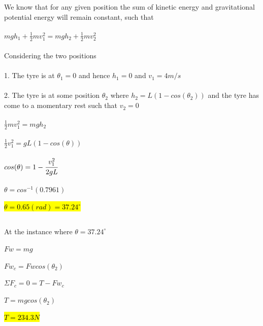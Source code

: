 \documentclass{article}
\begin{document}
\subsection{}
We know that for any given position the sum of kinetic energy and gravitational potential energy will remain constant, such that\\ \\
$mgh_1 + \frac{1}{2}mv_1^2 = mgh_2 + \frac{1}{2}mv_2^2$\\ \\
Considering the two positions\\ \\
1. The tyre is at $\theta_1 = 0$ and hence $h_1 = 0$ and $v_1 = 4m/s$\\ \\
2. The tyre is at some position $\theta_2$ where $h_2 = L(1 - cos(\theta_2))$ and the tyre has come to a momentary rest such that $v_2 = 0$\\ \\
$\frac{1}{2}mv_1^2 = mgh_2$\\ \\
$\frac{1}{2}v_1^2 = gL(1-cos(\theta))$\\ \\
$cos(\theta) = 1 - \cfrac{v_1^2}{2gL}$\\ \\
$\theta = cos^{-1}(0.7961)$\\ \\
\hl{$\theta = 0.65 (rad) = 37.24^{\circ}$}
\subsection{}
At the instance where $\theta = 37.24^{\circ}$ \\ \\
$Fw = mg$\\ \\
$Fw_c = Fwcos(\theta_2)$\\ \\
$\Sigma F_c = 0 = T - Fw_c$\\ \\
$T = mgcos(\theta_2)$\\ \\
\hl{$T = 234.3N$}
\end{document}
